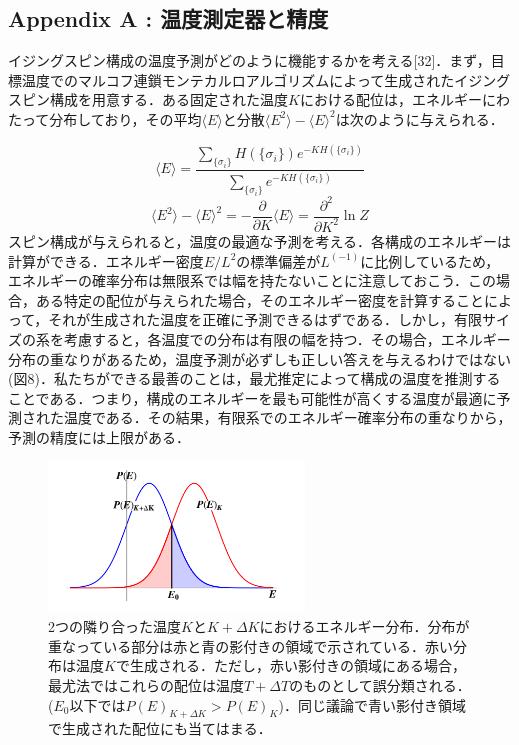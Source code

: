 \documentclass[a4paper,11pt]{jsarticle}
\begin{document}
\subsection*{Appendix A : 温度測定器と精度}
イジングスピン構成の温度予測がどのように機能するかを考える[32]．まず，目標温度でのマルコフ連鎖モンテカルロアルゴリズムによって生成されたイジングスピン構成を用意する．ある固定された温度$K$における配位は，エネルギーにわたって分布しており，その平均$\langle E \rangle$と分散$\langle E^2 \rangle - \langle E \rangle^2$は次のように与えられる．\par
\begin{equation}
  \langle E \rangle = \frac{\sum_{\{ \sigma_i \}}H(\{ \sigma_i \})e^{-KH(\{ \sigma_i \})}}{\sum_{\{ \sigma_i \}}e^{-KH(\{ \sigma_i \})}}
\end{equation}
\begin{equation}
  \langle E^2 \rangle - \langle E \rangle^2
  = -\frac{\partial}{\partial K}\langle E \rangle
  = \frac{\partial^2}{\partial K^2} \ln{Z}
\end{equation}
スピン構成が与えられると，温度の最適な予測を考える．各構成のエネルギーは計算ができる．エネルギー密度$E/L^2$の標準偏差が$L^(-1)$に比例しているため，エネルギーの確率分布は無限系では幅を持たないことに注意しておこう．この場合，ある特定の配位が与えられた場合，そのエネルギー密度を計算することによって，それが生成された温度を正確に予測できるはずである．しかし，有限サイズの系を考慮すると，各温度での分布は有限の幅を持つ．その場合，エネルギー分布の重なりがあるため，温度予測が必ずしも正しい答えを与えるわけではない(図8)．私たちができる最善のことは，最尤推定によって構成の温度を推測することである．つまり，構成のエネルギーを最も可能性が高くする温度が最適に予測された温度である．その結果，有限系でのエネルギー確率分布の重なりから，予測の精度には上限がある．\par
\begin{figure}
  \begin{center}
    \includegraphics[height=4cm]{image/Figure8.png}
    \caption{2つの隣り合った温度$K$と$K+\Delta K$におけるエネルギー分布．分布が重なっている部分は赤と青の影付きの領域で示されている．赤い分布は温度$K$で生成される．ただし，赤い影付きの領域にある場合，最尤法ではこれらの配位は温度$T+\Delta T$のものとして誤分類される．($E_0$以下では$P(E)_{K+ \Delta K} > P(E)_K$)．同じ議論で青い影付き領域で生成された配位にも当てはまる．}
  \end{center}
\end{figure}
\end{document}
